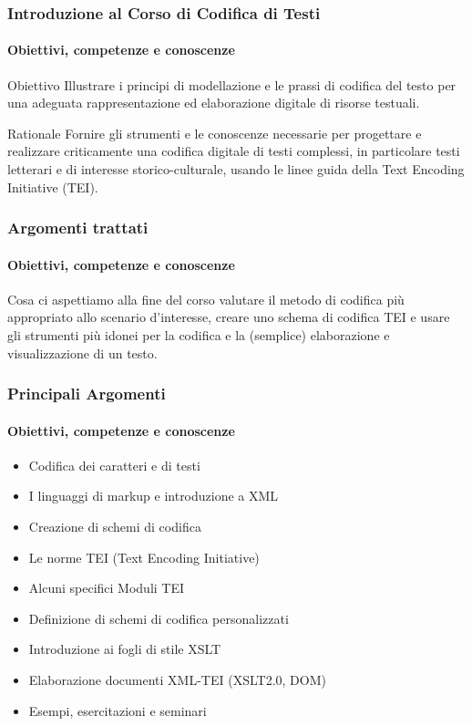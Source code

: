 
\begin{frame}
    \frametitle{Introduzione al Corso di Codifica di Testi}
    \framesubtitle{Obiettivi, competenze e conoscenze}
    \addtocounter{nframe}{1}
    
    \begin{block}{Obiettivo}
        Illustrare i principi di modellazione e le prassi di codifica del testo per una adeguata rappresentazione ed elaborazione digitale di risorse testuali.  
    \end{block}

    \begin{block}{Rationale}
       Fornire gli strumenti e le conoscenze necessarie per progettare e realizzare criticamente una codifica digitale di testi complessi, in particolare testi letterari e di interesse storico-culturale, usando le linee guida della Text Encoding Initiative (TEI).
    \end{block}

\end{frame}

\begin{frame}
    \frametitle{Argomenti trattati}
    \framesubtitle{Obiettivi, competenze e conoscenze}
    \addtocounter{nframe}{1}
    
    \begin{block}{Cosa ci aspettiamo alla fine del corso}
        valutare il metodo di codifica più appropriato allo scenario d'interesse, creare uno schema di codifica TEI e usare gli strumenti più idonei per la codifica e la (semplice) elaborazione e visualizzazione di un testo.
    \end{block}

\end{frame}

\begin{frame}
    \frametitle{Principali Argomenti}
    \framesubtitle{Obiettivi, competenze e conoscenze}
    \addtocounter{nframe}{1}

    
        \begin{itemize}
            \item Codifica dei caratteri e di testi
            \item I linguaggi di markup e introduzione a XML
            \item Creazione di schemi di codifica
            \item Le norme TEI (Text Encoding Initiative)
            \item Alcuni specifici Moduli TEI
            \item Definizione di schemi di codifica personalizzati
            \item Introduzione ai fogli di stile XSLT
            \item Elaborazione documenti XML-TEI (XSLT2.0, DOM)
            \item Esempi, esercitazioni e seminari 
        \end{itemize}

\end{frame}

